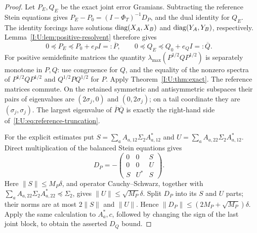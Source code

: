 \begin{proof}
Let $P_E,Q_E$ be the exact joint error Gramians. Subtracting the
reference Stein equations gives
$P_E-P_0=(I-\Phi_T)^{-1}D_P$, and the dual identity for $Q_E$.
The identity forcings have solutions
$\operatorname{diag}(X_A,X_B)$ and $\operatorname{diag}(Y_A,Y_B)$, respectively.
Lemma~\ref{I:U:lem:positive-resolvent} therefore gives
\[
 0\preceq P_E\preceq P_0+e_PI=:\overline P,\qquad
 0\preceq Q_E\preceq Q_0+e_QI=:\overline Q.
\]
For positive semidefinite matrices the quantity
$\lambda_{\max}(P^{1/2}QP^{1/2})$ is separately monotone in $P,Q$:
use congruence for $Q$, and the equality of the nonzero spectra of
$P^{1/2}QP^{1/2}$ and $Q^{1/2}PQ^{1/2}$ for $P$.
Apply Theorem~\ref{I:U:thm:exact}. The reference matrices commute.
On the retained symmetric and antisymmetric subspaces their pairs
of eigenvalues are $(2\sigma_j,0)$ and $(0,2\sigma_j)$; on a tail
coordinate they are $(\sigma_j,\sigma_j)$.
The largest eigenvalue of $\overline P\overline Q$ is exactly the
right-hand side of~\eqref{I:U:eq:reference-truncation}.

For the explicit estimates put
$S=\sum_aA_{a,12}\Sigma_2A_{a,12}^*$ and
$U=\sum_aA_{a,22}\Sigma_2A_{a,12}^*$.
Direct multiplication of the balanced Stein equations gives
\[
 D_P=-\begin{pmatrix}0&0&S\\0&0&U\\S&U^*&S\end{pmatrix}.
\]
Here $\|S\|\le M_P\delta$, and operator Cauchy--Schwarz, together
with $\sum_aA_{a,22}\Sigma_2A_{a,22}^*\preceq\Sigma_2$, gives
$\|U\|\le\sqrt{M_P}\delta$.
Split $D_P$ into its $S$ and $U$ parts; their norms are at most
$2\|S\|$ and $\|U\|$. Hence
$\|D_P\|\le(2M_P+\sqrt{M_P})\delta$.
Apply the same calculation to $A_a^*,c$, followed by changing the
sign of the last joint block, to obtain the asserted $D_Q$ bound.
\end{proof}
